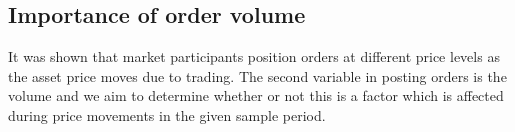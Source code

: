 
\subsection{Importance of order volume}
\label{sec:data-hypthesis-order-volume}

It was shown that market participants position orders at different price levels as the asset price moves due to trading.
The second variable in posting orders is the volume and we aim to determine whether or not this is a factor which is affected during price movements in the given sample period.



